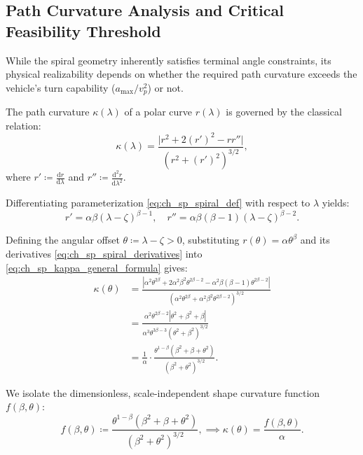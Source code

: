 \subsection{Path Curvature Analysis and Critical Feasibility Threshold}\label{subsec:ch_sp_curvature_analysis}

While the spiral geometry inherently satisfies terminal angle constraints, its physical realizability depends on whether the required path curvature exceeds the vehicle's turn capability ($a_{\max} / v_p^2$) or not. 

The path curvature $\kappa(\lambda)$ of a polar curve $r(\lambda)$ is governed by the classical relation:
\begin{equation}\label{eq:ch_sp_kappa_general_formula}
	\kappa(\lambda) = \frac{\big|r^2 + 2(r')^2 - r r''\big|}{\left( r^2 + (r')^2 \right)^{3/2}},
\end{equation}
where $r' \coloneqq \frac{\mathrm{d}r}{\mathrm{d}\lambda}$ and $r'' \coloneqq \frac{\mathrm{d}^2 r}{\mathrm{d}\lambda^2}$.

Differentiating parameterization \eqref{eq:ch_sp_spiral_def} with respect to $\lambda$ yields:
\begin{equation}\label{eq:ch_sp_spiral_derivatives}
    r' = \alpha \beta (\lambda - \zeta)^{\beta-1}, \quad r'' = \alpha \beta (\beta-1) (\lambda - \zeta)^{\beta-2}.
\end{equation}

Defining the angular offset $\theta \coloneqq \lambda - \zeta > 0$, substituting $r(\theta) = \alpha \theta^\beta$ and its derivatives \eqref{eq:ch_sp_spiral_derivatives} into \eqref{eq:ch_sp_kappa_general_formula} gives:
\begin{align}\label{eq:ch_sp_kappa_explicit_derivation}
	\kappa(\theta) &= \frac{\left| \alpha^2 \theta^{2\beta} + 2 \alpha^2 \beta^2 \theta^{2\beta-2} - \alpha^2 \beta(\beta-1) \theta^{2\beta-2} \right|}{\left( \alpha^2 \theta^{2\beta} + \alpha^2 \beta^2 \theta^{2\beta-2} \right)^{3/2}} \nonumber \\
	&= \frac{\alpha^2 \theta^{2\beta-2} \left| \theta^2 + \beta^2 + \beta \right|}{\alpha^3 \theta^{3\beta-3} \left( \theta^2 + \beta^2 \right)^{3/2}} \nonumber \\
	&= \frac{1}{\alpha} \cdot \frac{\theta^{1-\beta} (\beta^2 + \beta + \theta^2)}{(\beta^2 + \theta^2)^{3/2}}.
\end{align}

We isolate the dimensionless, scale-independent shape curvature function $f(\beta, \theta)$:
\begin{equation}\label{eq:ch_sp_f_beta_theta_def}
    f(\beta, \theta) \coloneqq \frac{\theta^{1-\beta} (\beta^2 + \beta + \theta^2)}{(\beta^2 + \theta^2)^{3/2}}, \implies \kappa(\theta) = \frac{f(\beta, \theta)}{\alpha}.
\end{equation}

